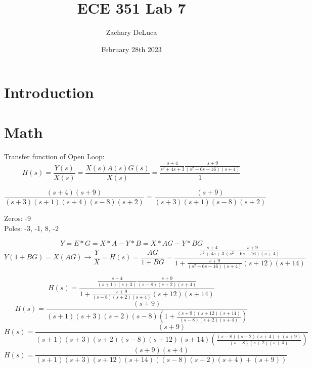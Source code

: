 \documentclass[12pt,a4paper]{article}
\title{ECE 351 Lab 7}
\author{Zachary DeLuca}
\date{February 28th 2023}
\begin{document}
	
\maketitle
\hline
\section{Introduction}
\section{Math}
Transfer function of Open Loop: 
$$H(s) = \frac{Y(s)}{X(s)}=\frac{X(s)A(s)G(s)}{X(s)}=\frac{\frac{s+4}{s^2+4s+3}\frac{s+9}{(s^2-6s-16)(s+4)}}{1}$$

$$\frac{(s+4)(s+9)}{(s+3)(s+1)(s+4)(s-8)(s+2)}=\frac{(s+9)}{(s+3)(s+1)(s-8)(s+2)}$$

Zeros: -9\\
Poles: -3, -1, 8, -2 \vspace{12pt}

$$Y = E*G=X*A-Y*B=X*AG-Y*BG$$
$$Y(1+BG)=X(AG)\rightarrow \frac{Y}{X}=H(s)=\frac{AG}{1+BG}=\frac{\frac{s+4}{s^2+4s+3}\frac{s+9}{(s^2-6s-16)(s+4)}}{1+\frac{s+9}{(s^2-6s-16)(s+4)}(s+12)(s+14)}$$

$$H(s)=\frac{\frac{s+4}{(s+1)(s+3)}\frac{s+9}{(s-8)(s+2)(s+4)}}{1+\frac{s+9}{(s-8)(s+2)(s+4)}(s+12)(s+14)}$$
$$H(s)=\frac{(s+9)}{(s+1)(s+3)(s+2)(s-8)(1+\frac{(s+9)(s+12)(s+14)}{(s-8)(s+2)(s+4)})}$$
$$H(s)=\frac{(s+9)}{(s+1)(s+3)(s+2)(s-8)(s+12)(s+14)(\frac{(s-8)(s+2)(s+4)+(s+9)}{(s-8)(s+2)(s+4)})}$$
$$H(s)=\frac{(s+9)(s+4)}{(s+1)(s+3)(s+12)(s+14)((s-8)(s+2)(s+4)+(s+9))}$$
\end{document}
